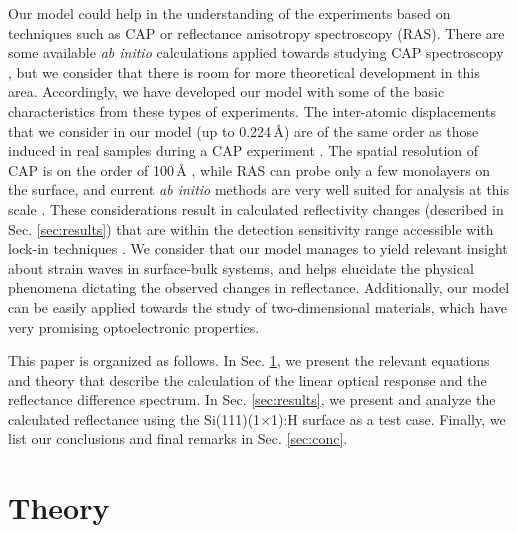 \documentclass[pss]{wiley2sp} %
\begin{document}
Our model could help in the understanding of the experiments based on techniques
such as CAP or reflectance anisotropy spectroscopy (RAS). There are some
available \emph{ab initio} calculations applied towards studying CAP
spectroscopy \cite{lawlerMRE14,steigerwaldJAP12}, but we consider that there is
room for more theoretical development in this area. Accordingly, we have
developed our model with some of the basic characteristics from these types of
experiments. The inter-atomic displacements that we consider in our model (up to
0.224\,{\AA}) are of the same order as those induced in real samples during a
CAP experiment \cite{lawlerMRE14}. The spatial resolution of CAP is on the order
of 100\,{\AA} \cite{thomsenPRB86}, while RAS can probe only a few monolayers on
the surface, and current \emph{ab initio} methods are very well suited for
analysis at this scale \cite{andersonPRB16b,andersonFMATS17}. These
considerations result in calculated reflectivity changes (described in Sec.
\ref{sec:results}) that are within the detection sensitivity range accessible
with lock-in techniques \cite{gregoryAPL12}. We consider that our model  manages
to yield relevant insight about strain waves in surface-bulk systems, and helps
elucidate the physical phenomena dictating the observed changes in reflectance.
Additionally, our model can be easily applied towards the study of
two-dimensional materials, which have very promising optoelectronic properties.

This paper is organized as follows. In Sec. \ref{sec:theory}, we present the
relevant equations and theory that describe the calculation of the linear
optical response and the reflectance difference spectrum. In Sec.
\ref{sec:results}, we present and analyze the calculated reflectance using the
Si(111)(1$\times$1):H surface as a test case. Finally, we list our conclusions
and final remarks in Sec. \ref{sec:conc}.


\section{Theory}\label{sec:theory}
\end{document}
